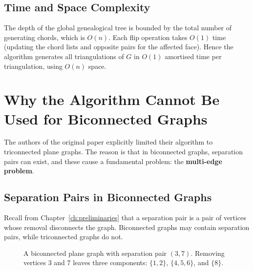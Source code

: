 \subsection{Time and Space Complexity}
\label{subsec:paper_complexity}

The depth of the global genealogical tree is bounded by the total number of generating chords, which is \(O(n)\). 
Each flip operation takes \(O(1)\) time (updating the chord lists and opposite pairs for the affected face). 
Hence the algorithm generates all triangulations of \(G\) in \(O(1)\) amortised time per triangulation, using \(O(n)\) space.

\section{Why the Algorithm Cannot Be Used for Biconnected Graphs}
\label{sec:paper_failure}

The authors of the original paper explicitly limited their algorithm to triconnected plane graphs. 
The reason is that in biconnected graphs, separation pairs can exist, and these cause a fundamental problem: the \textbf{multi-edge problem}.

\subsection{Separation Pairs in Biconnected Graphs}
\label{subsec:separation_pairs}

Recall from Chapter~\ref{ch:preliminaries} that a separation pair is a pair of vertices whose removal disconnects the graph. 
Biconnected graphs may contain separation pairs, while triconnected graphs do not.

\begin{figure}[htbp]
    \centering
    \caption{A biconnected plane graph with separation pair \((3,7)\). Removing vertices 3 and 7 leaves three components: \(\{1,2\}\), \(\{4,5,6\}\), and \(\{8\}\).}
    \label{fig:paper_separation_pair}
\end{figure}

